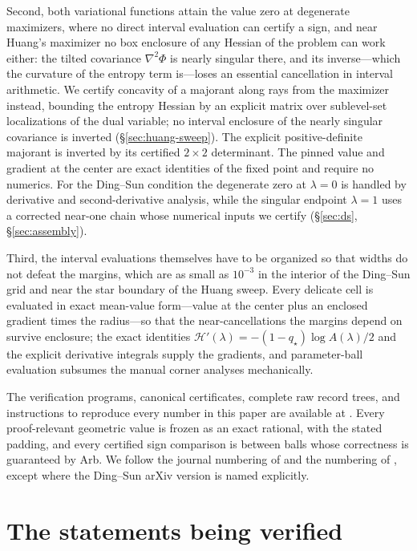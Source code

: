 \documentclass[11pt]{article}
\begin{document}
Second, both variational functions attain the value zero at degenerate
maximizers, where no direct interval evaluation can certify a sign, and near
Huang's maximizer no box enclosure of any Hessian of the problem can work
either: the tilted covariance $\nabla^2\Phi$ is nearly singular there, and
its inverse---which the curvature of the entropy term is---loses an
essential cancellation in interval arithmetic. We certify concavity of a
majorant along rays from the maximizer instead, bounding the entropy Hessian
by an explicit matrix over sublevel-set localizations of the dual variable;
no interval enclosure of the nearly singular covariance is inverted
(\S\ref{sec:huang-sweep}). The explicit positive-definite majorant is inverted
by its certified $2\times2$ determinant. The pinned value and
gradient at the center are exact identities of the fixed point and require
no numerics. For the Ding--Sun condition the degenerate zero at $\lambda=0$
is handled by derivative and second-derivative analysis, while the singular
endpoint $\lambda=1$ uses a corrected near-one chain whose numerical inputs
we certify (\S\ref{sec:ds},
\S\ref{sec:assembly}).

Third, the interval evaluations themselves have to be organized so that
widths do not defeat the margins, which are as small as $10^{-3}$ in the
interior of the Ding--Sun grid and near the star boundary of the Huang
sweep. Every delicate cell is evaluated in exact mean-value form---value at
the center plus an enclosed gradient times the radius---so that the
near-cancellations the margins depend on survive enclosure; the exact
identities $\mathcal{H}'(\lambda) = -(1-q_\star)\log A(\lambda)/2$ and the
explicit derivative integrals supply the gradients, and parameter-ball
evaluation subsumes the manual corner analyses mechanically.

\medskip
\noindent
The verification programs, canonical certificates, complete raw record trees,
and instructions to reproduce every number in this paper are available at
\cite{repo}. Every proof-relevant geometric value is frozen as an exact
rational, with the stated padding, and every certified sign comparison is
between balls whose correctness is guaranteed by Arb. We follow the journal
numbering of \cite{ding2018capacity} and the numbering of
\cite{huang2024capacity}, except where the Ding--Sun arXiv version is named
explicitly.

\section{The statements being verified}\label{sec:statements}
\end{document}
